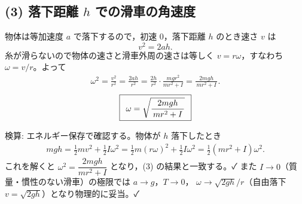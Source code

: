 \documentclass[11pt,a4paper]{article}
\begin{document}
\subsection*{(3) 落下距離 $h$ での滑車の角速度}
物体は等加速度 $a$ で落下するので，初速 $0$，落下距離 $h$ のとき速さ $v$ は
\[
  v^2 = 2 a h.
\]
糸が滑らないので物体の速さと滑車外周の速さは等しく $v=r\omega$，すなわち
$\omega=v/r$。よって
\begin{align*}
  \omega^2 = \frac{v^2}{r^2} = \frac{2 a h}{r^2}
           = \frac{2h}{r^2}\cdot\frac{m g r^2}{m r^2 + I}
           = \frac{2 m g h}{\,m r^2 + I\,}.
\end{align*}
\[
  \boxed{\,\; \omega = \sqrt{\dfrac{2 m g h}{\,m r^2 + I\,}} \;\,}
\]

\medskip
検算: エネルギー保存で確認する。物体が $h$ 落下したとき
\begin{align*}
  m g h = \tfrac{1}{2}m v^2 + \tfrac{1}{2}I\omega^2
        = \tfrac{1}{2}m (r\omega)^2 + \tfrac{1}{2}I\omega^2
        = \tfrac{1}{2}(m r^2 + I)\omega^2 .
\end{align*}
これを解くと $\omega^2=\dfrac{2mgh}{mr^2+I}$ となり，(3) の結果と一致する。✓
また $I\to0$（質量・慣性のない滑車）の極限では $a\to g$，$T\to0$，
$\omega\to\sqrt{2gh}/r$（自由落下 $v=\sqrt{2gh}$）となり物理的に妥当。✓
\end{document}
